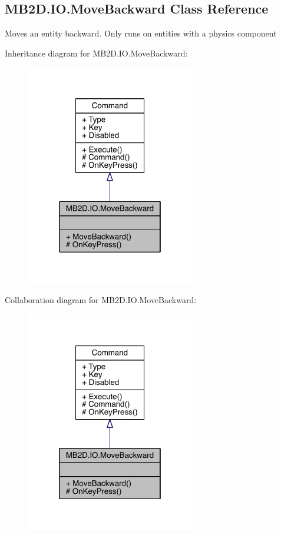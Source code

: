 \hypertarget{class_m_b2_d_1_1_i_o_1_1_move_backward}{}\subsection{M\+B2\+D.\+I\+O.\+Move\+Backward Class Reference}
\label{class_m_b2_d_1_1_i_o_1_1_move_backward}


Moves an entity backward. Only runs on entities with a physics component  




Inheritance diagram for M\+B2\+D.\+I\+O.\+Move\+Backward\+:
\nopagebreak
\begin{figure}[H]
\begin{center}
\leavevmode
\includegraphics[width=208pt]{class_m_b2_d_1_1_i_o_1_1_move_backward__inherit__graph}
\end{center}
\end{figure}


Collaboration diagram for M\+B2\+D.\+I\+O.\+Move\+Backward\+:
\nopagebreak
\begin{figure}[H]
\begin{center}
\leavevmode
\includegraphics[width=208pt]{class_m_b2_d_1_1_i_o_1_1_move_backward__coll__graph}
\end{center}
\end{figure}

